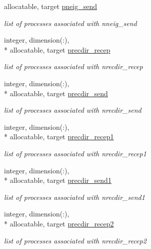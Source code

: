 \begin{DoxyCompactItemize}
allocatable, target \hyperlink{classdomdec_a2b90bf1f406fc3b495a131fb93aae791}{pneig\-\_\-send}
\begin{DoxyCompactList}\small\item\em list of processes associated with nneig\-\_\-send \end{DoxyCompactList}\item 
integer, dimension(\-:), \\*
allocatable, target \hyperlink{classdomdec_a9d4ef203aab7fcb23853f1094862b4da}{precdir\-\_\-recep}
\begin{DoxyCompactList}\small\item\em list of processes associated with nrecdir\-\_\-recep \end{DoxyCompactList}\item 
integer, dimension(\-:), \\*
allocatable, target \hyperlink{classdomdec_a197dc0ce20dbc808eecabcf74df5960c}{precdir\-\_\-send}
\begin{DoxyCompactList}\small\item\em list of processes associated with nrecdir\-\_\-send \end{DoxyCompactList}\item 
integer, dimension(\-:), \\*
allocatable, target \hyperlink{classdomdec_abd7674f40dc278e85d7a97360a487819}{precdir\-\_\-recep1}
\begin{DoxyCompactList}\small\item\em list of processes associated with nrecdir\-\_\-recep1 \end{DoxyCompactList}\item 
integer, dimension(\-:), \\*
allocatable, target \hyperlink{classdomdec_a7d3fe3da2fd8976c2169e00a21944c50}{precdir\-\_\-send1}
\begin{DoxyCompactList}\small\item\em list of processes associated with nrecdir\-\_\-send1 \end{DoxyCompactList}\item 
integer, dimension(\-:), \\*
allocatable, target \hyperlink{classdomdec_a851d5a5f2c7eb233e9e3e54770d57f0f}{precdir\-\_\-recep2}
\begin{DoxyCompactList}\small\item\em list of processes associated with nrecdir\-\_\-recep2 \end{DoxyCompactList}\item 

\end{DoxyCompactItemize}
